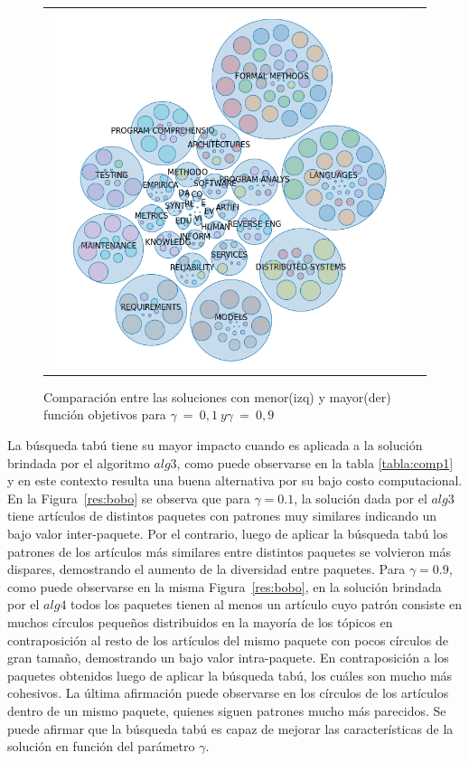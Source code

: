 \begin{figure}[H]
\begin{tabular}{cc}
			\includegraphics[width=0.5\linewidth]{img/gamma-09-burbujas-alg-1.png}\\
	\end{tabular}
	\caption{Comparación entre las soluciones con menor(izq) y mayor(der) función objetivos  para $\gamma\ =\ 0,1\ y \gamma\ =\ 0,9$}
	\label{res:comp1}
\end{figure}

La búsqueda tabú tiene su mayor impacto cuando es aplicada a la solución brindada por el algoritmo $alg3$, como puede observarse en la tabla \autoref{tabla:comp1} y en este contexto resulta una buena alternativa por su bajo costo computacional. En la Figura~\ref{res:bobo} se observa que para $\gamma=0.1$, la solución dada por el $alg3$ tiene artículos de distintos paquetes con patrones muy similares indicando un bajo valor inter-paquete. Por el contrario, luego de aplicar la búsqueda tabú los patrones de los artículos más similares entre distintos paquetes se volvieron más dispares, demostrando el aumento de la diversidad entre paquetes. Para $\gamma=0.9$, como puede observarse en la misma Figura~\ref{res:bobo}, en la solución brindada por el $alg4$ todos los paquetes tienen al menos un artículo cuyo patrón consiste en muchos círculos pequeños distribuidos en la mayoría de los tópicos en contraposición al resto de los artículos del mismo paquete con pocos círculos de gran tamaño, demostrando un bajo valor intra-paquete. En contraposición a los paquetes obtenidos luego de aplicar la búsqueda tabú, los cuáles son mucho más cohesivos. La última afirmación puede observarse en los círculos de los artículos dentro de un mismo paquete, quienes siguen patrones mucho más parecidos. Se puede afirmar que la búsqueda tabú es capaz de mejorar las características de la solución en función del parámetro $\gamma$.

